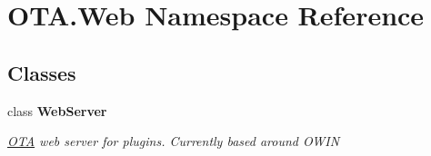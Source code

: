 \hypertarget{namespace_o_t_a_1_1_web}{}\section{O\+T\+A.\+Web Namespace Reference}
\label{namespace_o_t_a_1_1_web}
\subsection*{Classes}
\begin{DoxyCompactItemize}
\item 
class {\bfseries Web\+Server}
\begin{DoxyCompactList}\small\item\em \hyperlink{namespace_o_t_a}{O\+T\+A} web server for plugins. Currently based around O\+W\+I\+N \end{DoxyCompactList}\end{DoxyCompactItemize}

